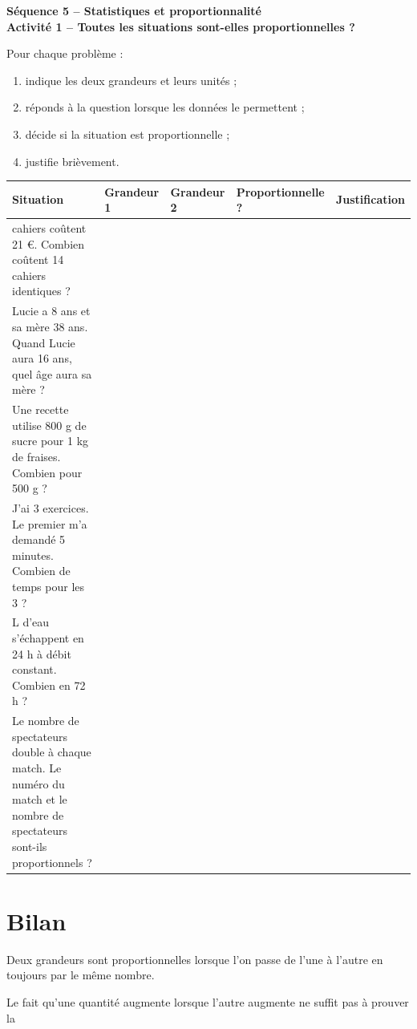 \documentclass[12pt,a4paper]{article}
\newcommand{\titreseq}[1]{%
\begin{center}
  {\sffamily\LARGE\bfseries\color{TitreC}
  Séquence 5 -- Statistiques et proportionnalité}\\[0.2em]
  {\sffamily\large\bfseries\color{SavoirC}#1}
\end{center}
}
\begin{document}
\titreseq{Activité 1 -- Toutes les situations sont-elles proportionnelles ?}


Pour chaque problème :

\begin{enumerate}
  \item indique les deux grandeurs et leurs unités ;
  \item réponds à la question lorsque les données le permettent ;
  \item décide si la situation est proportionnelle ;
  \item justifie brièvement.
\end{enumerate}

\renewcommand{\arraystretch}{1.35}
\begin{tabularx}{\textwidth}{
|>{\raggedright\arraybackslash}p{5.8cm}
|>{\raggedright\arraybackslash}p{2.6cm}
|>{\raggedright\arraybackslash}p{2.6cm}
|>{\centering\arraybackslash}p{2cm}
|X|}
\hline
\textbf{Situation} & \textbf{Grandeur 1} & \textbf{Grandeur 2} &
\textbf{Proportionnelle ?} & \textbf{Justification}\\
\hline
7 cahiers coûtent 21 €. Combien coûtent 14 cahiers identiques ? & & & & \\
\hline
Lucie a 8 ans et sa mère 38 ans. Quand Lucie aura 16 ans, quel âge aura sa mère ? & & & & \\
\hline
Une recette utilise 800 g de sucre pour 1 kg de fraises. Combien pour 500 g ? & & & & \\
\hline
J'ai 3 exercices. Le premier m'a demandé 5 minutes. Combien de temps pour les 3 ? & & & & \\
\hline
6 L d'eau s'échappent en 24 h à débit constant. Combien en 72 h ? & & & & \\
\hline
Le nombre de spectateurs double à chaque match. Le numéro du match et le nombre de spectateurs sont-ils proportionnels ? & & & & \\
\hline
\end{tabularx}

\section*{Bilan}

\begin{tcolorbox}[colback=SavoirC!5,colframe=SavoirC!60,boxrule=0.7pt,arc=2mm]
Deux grandeurs sont proportionnelles lorsque l'on passe de l'une à l'autre
en \dotfill{} toujours par le même nombre.

Le fait qu'une quantité augmente lorsque l'autre augmente ne suffit pas à prouver
la \dotfill
\end{tcolorbox}
\end{document}
